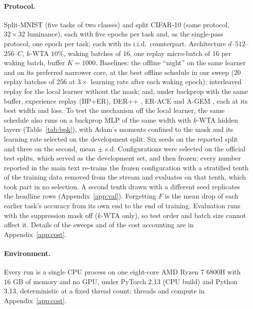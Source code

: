 \documentclass{article}
\newcommand{\kwta}{$k$-WTA}
\begin{document}
\paragraph{Protocol.} Split-MNIST (five tasks of two classes) and split CIFAR-10 (same
protocol, $32{\times}32$ luminance), each with five epochs per task and, as the single-pass
protocol, one epoch per task; each with its i.i.d.\ counterpart. Architecture
$d$--$512$--$256$--$C$, \kwta{} $10\%$, waking batches of $16$, one replay micro-batch of
$16$ per waking batch, buffer $K{=}1000$. Baselines: the offline ``night'' on the same
learner and on its preferred narrower core, at the best offline schedule in our sweep
($20$ replay batches of $256$ at $3\times$ learning rate after each waking epoch);
interleaved replay for the local learner without the mask; and, under backprop with the same buffer, experience
replay (BP+ER), DER++ \citep{buzzega2020}, ER-ACE \citep{caccia2022} and A-GEM
\citep{chaudhry2019}, each at its best width and loss. To test the mechanism off the local
learner, the same schedule also runs on a backprop MLP of the same width with \kwta{} hidden
layers (Table~\ref{tab:bpk}), with Adam's moments confined to the mask and its learning
rate selected on the development split. Six seeds on the reported
split and three on the second, mean $\pm$ s.d. Configurations were selected on the official
test splits, which served as the development set, and then frozen; every number reported in
the main text re-trains the frozen configuration with a stratified tenth of the training data
removed from the stream and evaluates on that tenth, which took part in no selection. A second tenth drawn
with a different seed replicates the headline rows (Appendix~\ref{app:val}). Forgetting $F$
is the mean drop of each earlier task's accuracy from its own end to the end of training.
Evaluation runs with the suppression mask off (\kwta{} only), so test order and batch size
cannot affect it. Details of the sweeps and of the cost accounting are in
Appendix~\ref{app:cost}.

\paragraph{Environment.} Every run is a single CPU process on one eight-core AMD Ryzen 7
6800H with $16$ GB of memory and no GPU, under PyTorch 2.13 (CPU build) and Python 3.13,
deterministic at a fixed thread count; threads and compute in Appendix~\ref{app:cost}.

\end{document}
